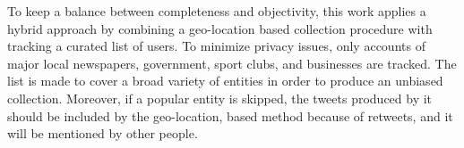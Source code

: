 \documentclass{IOS-Book-Article}
\begin{document}
To keep a balance between completeness and objectivity, this work applies a hybrid approach by combining a geo-location based collection procedure with tracking a curated list of users. To minimize privacy issues, only accounts of major local newspapers, government, sport clubs, and businesses are tracked. The list is made to cover a broad variety of entities in order to produce an unbiased collection. Moreover, if a popular entity is skipped, the tweets produced by it should be included by the geo-location, based method because of retweets, and it will be mentioned by other people.





\end{document}
